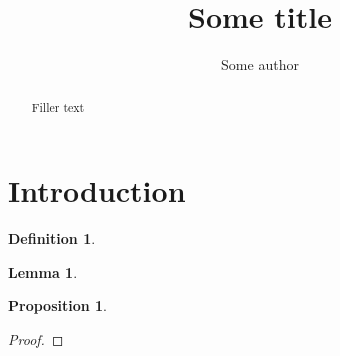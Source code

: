 \documentclass[a4paper,llpt]{amsart}
\title{Some title}
\author{Some author}
\newtheorem{prop}[theorem]{Proposition}
\newtheorem{lemma}[theorem]{Lemma}
\theoremstyle{remark}
\theoremstyle{definition}
\newtheorem{definition}[theorem]{Definition}
\begin{document}
\maketitle

\begin{abstract}
    Filler text
\end{abstract}

\section{Introduction}

\begin{definition}
    
\end{definition}

\begin{lemma}
    
\end{lemma}

\begin{prop}

\end{prop}
\begin{proof}
    
\end{proof}
\section{}

\section{}



\begin{thebibliography}
    
\end{thebibliography}
\end{document}
